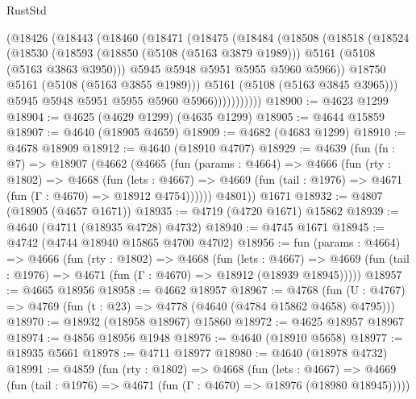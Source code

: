 \begin{lexlean}{RustStd}
\begin{coremodule}
              (@18426
                (@18443
                  (@18460
                    (@18471
                      (@18475
                        (@18484
                          (@18508
                            (@18518
                              (@18524
                                (@18530
                                  (@18593
                                    (@18850 (@5108 (@5163 @3879 @1989)))
                                    @5161
                                    (@5108 (@5163 @3863 @3950)))
                                  @5945
                                  @5948
                                  @5951
                                  @5955
                                  @5960
                                  @5966))
                              @18750
                              @5161
                              (@5108 (@5163 @3855 @1989)))
                            @5161
                            (@5108 (@5163 @3845 @3965)))
                          @5945
                          @5948
                          @5951
                          @5955
                          @5960
                          @5966)))))))))))
@18900 := @4623 @1299
@18904 := @4625 (@4629 @1299) (@4635 @1299)
@18905 := @4644 @15859
@18907 := @4640 (@18905 @4659)
@18909 := @4682 (@4683 @1299)
@18910 := @4678 @18909
@18912 := @4640 (@18910 @4707)
@18929 := @4639
    (fun (fn : @7) =>
    @18907
      (@4662
        (@4665
          (fun (params : @4664) =>
          @4666
            (fun (rty : @1802) =>
            @4668
              (fun (lets : @4667) =>
              @4669 (fun (tail : @1976) => @4671 (fun (Γ : @4670) => @18912 @4754))))))
        @4801))
    @1671
@18932 := @4807 (@18905 (@4657 @1671))
@18935 := @4719 (@4720 @1671) @15862
@18939 := @4640 (@4711 (@18935 @4728) @4732)
@18940 := @4745 @1671
@18945 := @4742 (@4744 @18940 @15865 @4700 @4702)
@18956 := fun (params : @4664) =>
  @4666
    (fun (rty : @1802) =>
    @4668
      (fun (lets : @4667) =>
      @4669 (fun (tail : @1976) => @4671 (fun (Γ : @4670) => @18912 (@18939 @18945)))))
@18957 := @4665 @18956
@18958 := @4662 @18957
@18967 := @4768
    (fun (U : @4767) => @4769 (fun (t : @23) => @4778 (@4640 (@4784 @15862 @4658) @4795)))
@18970 := @18932 (@18958 @18967) @15860
@18972 := @4625 @18957 @18967
@18974 := @4856 @18956 @1948
@18976 := @4640 (@18910 @5658)
@18977 := @18935 @5661
@18978 := @4711 @18977
@18980 := @4640 (@18978 @4732)
@18991 := @4859
    (fun (rty : @1802) =>
    @4668
      (fun (lets : @4667) =>
      @4669 (fun (tail : @1976) => @4671 (fun (Γ : @4670) => @18976 (@18980 @18945)))))

\end{coremodule}
\end{lexlean}
